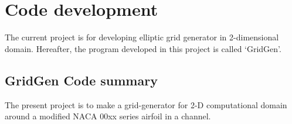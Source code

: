 \documentclass[letterpaper,10pt,english]{sphinxmanual}
\begin{document}
\begin{sphinxVerbatim}[commandchars=\\\{\}]
       
       
\end{sphinxVerbatim}


\section{Code development}
\label{\detokenize{devel:code-development}}\label{\detokenize{devel::doc}}
The current project is for developing elliptic grid generator in 2-dimensional domain. Hereafter, the program developed in this project is called ‘GridGen’.


\subsection{GridGen Code summary}
\label{\detokenize{devel:gridgen-code-summary}}
The present project is to make a grid-generator for 2-D computational domain around a modified NACA 00xx series airfoil in a channel.
\end{document}
